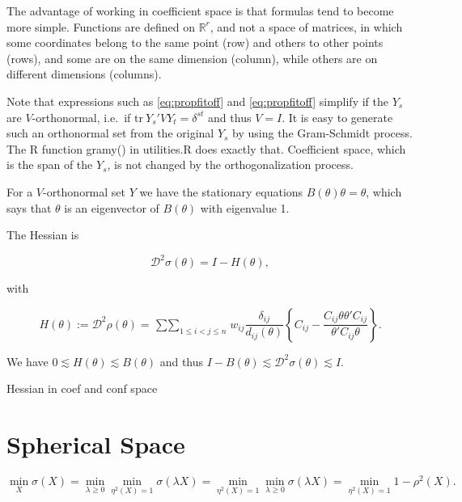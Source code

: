 \documentclass[
  12pt,
]{book}
\theoremstyle{definition}
\theoremstyle{definition}
\theoremstyle{definition}
\theoremstyle{definition}
\theoremstyle{remark}
\begin{document}
The advantage of working in coefficient space is that formulas tend to become more simple. Functions are defined on \(\mathbb{R}^r\), and not a space of matrices, in which some coordinates belong to the same point (row) and others to other points (rows), and some are on the same dimension (column), while others are on different dimensions (columns).

Note that expressions such as \eqref{eq:propfitoff}
and \eqref{eq:propfitoff}
simplify if the \(Y_s\) are \(V\)-orthonormal, i.e.~if \(\text{tr}\ Y_s'VY_t=\delta^{st}\) and thus \(V=I\). It is easy to generate such an orthonormal set from the original \(Y_s\) by using the Gram-Schmidt process. The R function gramy() in utilities.R does exactly that. Coefficient space, which is the span of the \(Y_s\), is not changed by the orthogonalization process.

For a \(V\)-orthonormal set \(Y\) we have the stationary equations \(B(\theta)\theta=\theta\), which says that \(\theta\) is an eigenvector of \(B(\theta)\) with eigenvalue 1.

The Hessian is

\begin{equation}
\mathcal{D}^2\sigma(\theta)=I-H(\theta),
\label{eq:hessmat}
\end{equation}

with

\begin{equation}
H(\theta):=\mathcal{D}^2\rho(\theta)=\mathop{\sum\sum}_{1\leq i<j\leq n}w_{ij}\frac{\delta_{ij}}{d_{ij}(\theta)}\left\{C_{ij}-\frac{C_{ij}\theta\theta'C_{ij}}{\theta'C_{ij}\theta}\right\}.
\label{eq:rhohessdef}
\end{equation}

We have \(0\lesssim H(\theta)\lesssim B(\theta)\) and thus \(I-B(\theta)\lesssim\mathcal{D}^2\sigma(\theta)\lesssim I\).

Hessian in coef and conf space

\hypertarget{propspherespace}{%
\section{Spherical Space}\label{propspherespace}}

\begin{equation}
\min_X\sigma(X)=\min_{\lambda\geq 0}\min_{\eta^2(X)=1}\sigma(\lambda X)=\min_{\eta^2(X)=1}\min_{\lambda\geq 0}\sigma(\lambda X)=
\min_{\eta^2(X)=1}1-\rho^2(X).
\label{eq:homequ}
\end{equation}
\end{document}
